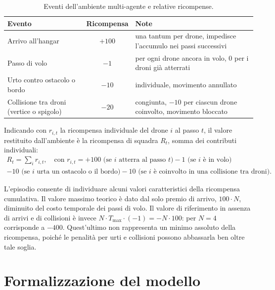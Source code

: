 \documentclass[12pt,a4paper,twoside]{report}
\newcommand{\fonte}[1][elaborazione propria]{\par\vspace{3pt}{\footnotesize\emph{Fonte: #1.}}}
\begin{document}
\begin{table}[htbp]
    \centering
    \begin{tabularx}{\textwidth}{l c X}
        \toprule
        \textbf{Evento} & \textbf{Ricompensa} & \textbf{Note} \\
        \midrule
        Arrivo all'hangar                        & $+100$ & una tantum per drone, impedisce l'accumulo nei passi successivi \\
        Passo di volo                            & $-1$   & per ogni drone ancora in volo, $0$ per i droni già atterrati \\
        Urto contro ostacolo o bordo             & $-10$  & individuale, movimento annullato \\
        Collisione tra droni (vertice o spigolo) & $-20$  & congiunta, $-10$ per ciascun drone coinvolto, movimento bloccato \\
        \bottomrule
    \end{tabularx}
    \caption{Eventi dell'ambiente multi-agente e relative ricompense.}
    \label{tab:3_3}
    \fonte
\end{table}

Indicando con $r_{i,t}$ la ricompensa individuale del drone $i$ al passo $t$, il valore restituito dall'ambiente è la ricompensa di squadra $R_t$, somma dei contributi individuali:
\begin{multline*}
R_t = \sum_i r_{i,t}, \quad \text{con } r_{i,t} = +100\text{ (se $i$ atterra al passo $t$)} - 1\text{ (se $i$ è in volo)} \\
- 10\text{ (se $i$ urta un ostacolo o il bordo)} - 10\text{ (se $i$ è coinvolto in una collisione tra droni)}.
\end{multline*}

L'episodio consente di individuare alcuni valori caratteristici della ricompensa cumulativa. Il valore massimo teorico è dato dal solo premio di arrivo, $100 \cdot N$, diminuito del costo temporale dei passi di volo. Il valore di riferimento in assenza di arrivi e di collisioni è invece $N \cdot T_{\max} \cdot (-1) = -N \cdot 100$: per $N = 4$ corrisponde a $-400$. Quest'ultimo non rappresenta un minimo assoluto della ricompensa, poiché le penalità per urti e collisioni possono abbassarla ben oltre tale soglia.

\section{Formalizzazione del modello}
\label{sec:formalizzazione}
\end{document}
